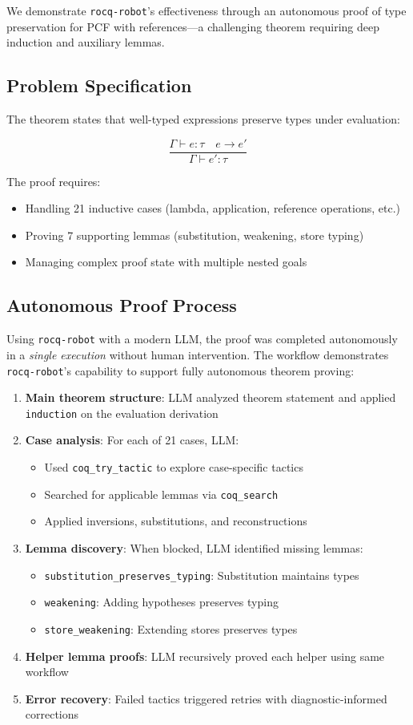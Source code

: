 \documentclass[11pt,a4paper]{article}
\newcommand{\tool}{\texttt{rocq-robot}\xspace}
\begin{document}
We demonstrate \tool's effectiveness through an autonomous proof of type preservation for PCF with references—a challenging theorem requiring deep induction and auxiliary lemmas.

\subsection{Problem Specification}

The theorem states that well-typed expressions preserve types under evaluation:

\[
\frac{\Gamma \vdash e : \tau \quad e \rightarrow e'}{\Gamma \vdash e' : \tau}
\]

The proof requires:
\begin{itemize}
\item Handling 21 inductive cases (lambda, application, reference operations, etc.)
\item Proving 7 supporting lemmas (substitution, weakening, store typing)
\item Managing complex proof state with multiple nested goals
\end{itemize}

\subsection{Autonomous Proof Process}

Using \tool with a modern LLM, the proof was completed autonomously in a \emph{single execution} without human intervention. The workflow demonstrates \tool's capability to support fully autonomous theorem proving:

\begin{enumerate}
\item \textbf{Main theorem structure}: LLM analyzed theorem statement and applied \texttt{induction} on the evaluation derivation
\item \textbf{Case analysis}: For each of 21 cases, LLM:
  \begin{itemize}
  \item Used \texttt{coq\_try\_tactic} to explore case-specific tactics
  \item Searched for applicable lemmas via \texttt{coq\_search}
  \item Applied inversions, substitutions, and reconstructions
  \end{itemize}
\item \textbf{Lemma discovery}: When blocked, LLM identified missing lemmas:
  \begin{itemize}
  \item \texttt{substitution\_preserves\_typing}: Substitution maintains types
  \item \texttt{weakening}: Adding hypotheses preserves typing
  \item \texttt{store\_weakening}: Extending stores preserves types
  \end{itemize}
\item \textbf{Helper lemma proofs}: LLM recursively proved each helper using same workflow
\item \textbf{Error recovery}: Failed tactics triggered retries with diagnostic-informed corrections
\end{enumerate}
\end{document}
